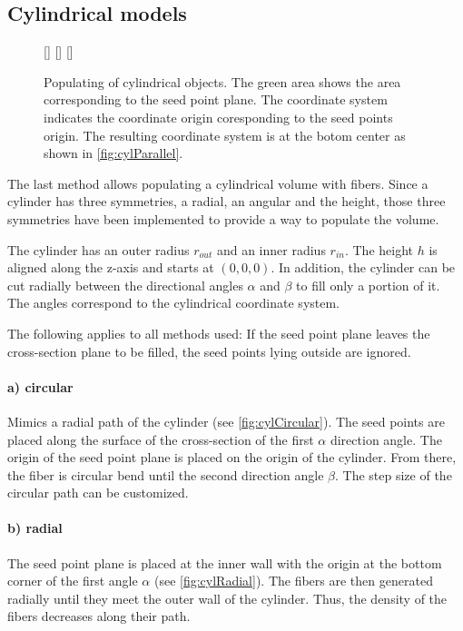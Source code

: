 \subsection{Cylindrical models}
%
\begin{figure}[!t]
    \centering
    \setlength{\tikzwidth}{0.3\textwidth}
    [\tikzwidth]{
    }\hfill
    [\tikzwidth]{
    }\hfill
    [\tikzwidth]{
    }
	\caption{Populating of cylindrical objects. The green area shows the area corresponding to the seed point plane. The coordinate system indicates the coordinate origin coresponding to the seed points origin. The resulting coordinate system is at the botom center as shown in \cref{fig:cylParallel}.}
\end{figure}
%
The last method allows populating a cylindrical volume with fibers.
Since a cylinder has three symmetries, a radial, an angular and the height, those three symmetries have been implemented to provide a way to populate the volume.
\par
%
The cylinder has an outer radius $r_{\mathit{out}}$ and an inner radius $r_{\mathit{in}}$.
The height $h$ is aligned along the z-axis and starts at $(0,0,0)$.
In addition, the cylinder can be cut radially between the directional angles $\alpha$ and $\beta$ to fill only a portion of it.
The angles correspond to the cylindrical coordinate system.
\par
%
The following applies to all methods used: If the seed point plane leaves the cross-section plane to be filled, the seed points lying outside are ignored.
%
\paragraph{a) circular}
Mimics a radial path of the cylinder (see \cref{fig:cylCircular}).
The seed points are placed along the surface of the cross-section of the first $\alpha$ direction angle.
The origin of the seed point plane is placed on the origin of the cylinder.
From there, the fiber is circular bend until the second direction angle $\beta$.
The step size of the circular path can be customized.
%
\paragraph{b) radial}
The seed point plane is placed at the inner wall with the origin at the bottom corner of the first angle $\alpha$ (see \cref{fig:cylRadial}).
The fibers are then generated radially until they meet the outer wall of the cylinder.
Thus, the density of the fibers decreases along their path.
%
